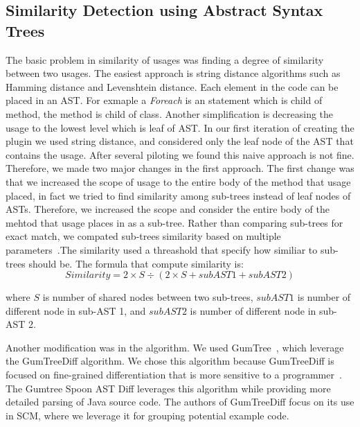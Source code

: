 \documentclass[conference]{IEEEtran}
\begin{document}
\subsection{Similarity Detection using Abstract Syntax Trees}
The basic problem in similarity of usages was finding a degree of similarity between two usages. The easiest approach is string distance algorithms such as Hamming distance and Levenshtein distance. Each element in the code can be placed in an AST. For exmaple a \textit{Foreach} is an statement which is child of method, the method is child of class. Another simplification is decreasing the usage to the lowest level which is leaf of AST. In our first iteration of creating the plugin we used string distance, and considered only the leaf node of the AST that contains the usage. After several piloting we found this naive approach is not fine. Therefore, we made two major changes in the first approach. The first change was that we increased the scope of usage to the entire body of the method that usage placed, in fact we tried to find similarity among sub-trees instead of leaf nodes of ASTs. Therefore, we increased the scope and consider the entire body of the mehtod that usage places in as a sub-tree. Rather than comparing sub-trees for exact match, we compated sub-trees similarity based on multiple parameters~\cite{baxter1998clone}.The similarity used a threashold that specify how similiar to sub-trees should be. The formula that compute similarity is:
\begin{equation}
Similarity = 2 \times S  \div (2  \times S  + subAST1 + subAST2)
\label{equation1}
\end{equation}

where $S$ is number of shared nodes between two sub-trees, $subAST1$ is number of different node in sub-AST 1, and $subAST2$ is number of different node in sub-AST 2. \par
Another modification was in the algorithm. We used GumTree~\cite{baxter1998clone,DBLP:conf/kbse/FalleriMBMM14,falleri2014fine}, which leverage the GumTreeDiff algorithm. We chose this algorithm because GumTreeDiff is focused on fine-grained differentiation that is more sensitive to a programmer~\cite{falleri2014fine}. The Gumtree Spoon AST Diff leverages this algorithm while providing more detailed parsing of Java source code. The authors of GumTreeDiff focus on its use in SCM, where we leverage it for grouping potential example code. \par
\end{document}
